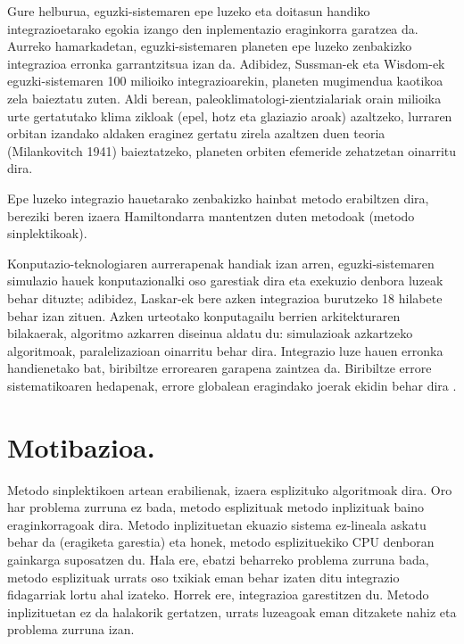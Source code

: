 Gure helburua, eguzki-sistemaren epe luzeko eta doitasun handiko integrazioetarako egokia izango den inplementazio eraginkorra garatzea da. Aurreko hamarkadetan, eguzki-sistemaren planeten epe luzeko zenbakizko integrazioa erronka garrantzitsua izan da. Adibidez, Sussman-ek eta Wisdom-ek  eguzki-sistemaren 100 milioiko integrazioarekin, planeten mugimendua kaotikoa zela baieztatu zuten. Aldi berean, paleoklimatologi-zientzialariak orain milioika urte gertatutako klima zikloak (epel, hotz eta glaziazio aroak) azaltzeko, lurraren orbitan izandako aldaken eraginez gertatu zirela azaltzen duen teoria (Milankovitch 1941) \cite{Berger2012} baieztatzeko, planeten orbiten efemeride zehatzetan oinarritu dira.        

Epe luzeko integrazio hauetarako zenbakizko hainbat metodo erabiltzen dira, bereziki beren izaera Hamiltondarra mantentzen duten metodoak (metodo sinplektikoak).

Konputazio-teknologiaren aurrerapenak handiak izan arren, eguzki-sistemaren simulazio hauek konputazionalki oso garestiak dira eta exekuzio denbora luzeak behar dituzte; adibidez, Laskar-ek  bere azken integrazioa burutzeko 18 hilabete behar izan zituen.
Azken urteotako konputagailu berrien arkitekturaren bilakaerak, algoritmo azkarren diseinua aldatu du: simulazioak azkartzeko algoritmoak, paralelizazioan oinarritu behar dira. Integrazio luze hauen erronka handienetako bat, biribiltze errorearen garapena zaintzea da. Biribiltze errore sistematikoaren hedapenak, errore globalean eragindako joerak ekidin behar dira \cite{Laskar2015}.
 
\section{Motibazioa.}
\label{intro}


Metodo sinplektikoen artean erabilienak, izaera esplizituko algoritmoak dira. Oro har problema zurruna ez bada, metodo esplizituak  metodo inplizituak baino eraginkorragoak dira. Metodo inplizituetan ekuazio sistema ez-lineala askatu behar da (eragiketa garestia) eta honek, metodo esplizituekiko CPU denboran gainkarga suposatzen du. Hala ere, ebatzi beharreko problema zurruna bada, metodo esplizituak urrats oso txikiak eman behar izaten ditu integrazio fidagarriak lortu ahal izateko. Horrek ere, integrazioa garestitzen du. Metodo inplizituetan ez da halakorik gertatzen, urrats luzeagoak eman ditzakete nahiz eta problema zurruna izan. 

